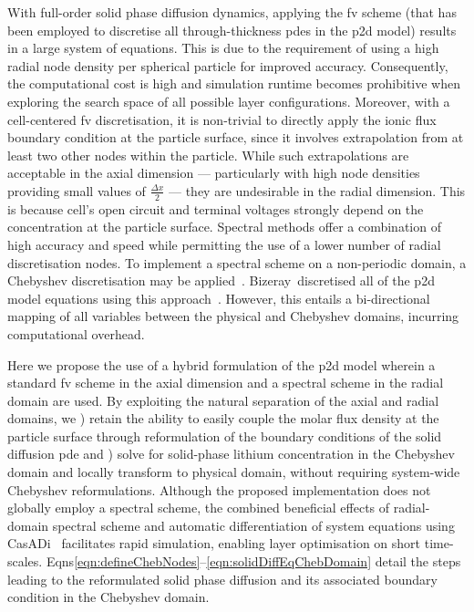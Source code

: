 With full-order solid phase diffusion dynamics, applying the \gls{fv} scheme
(that has been employed to discretise all through-thickness \gls{pde}s in the
\gls{p2d} model) results in a large system of equations. This is due to the
requirement of using a high radial node density per spherical particle
for improved accuracy. Consequently, the computational cost is high and
simulation runtime becomes prohibitive when exploring the search space of
all possible layer configurations. Moreover, with a cell-centered \gls{fv}
discretisation, it is non-trivial to directly apply the ionic flux boundary
condition at the particle surface, since it involves extrapolation from at
least two other nodes within the particle. While such extrapolations are
acceptable in the axial dimension --- particularly with high node densities
providing small values of $\frac{\Delta x}{2}$ --- they are undesirable in
the radial dimension. This is because cell's open circuit and terminal
voltages strongly depend on the concentration at the particle surface. Spectral
methods offer a combination of high accuracy and speed while permitting
the use of a lower number of radial discretisation nodes. To implement a
spectral scheme on a non-periodic domain, a Chebyshev discretisation may be
applied~\cite{Trefethen2000}. Bizeray~\etal discretised all of the \gls{p2d}
model equations using this approach~\cite{Bizeray2015a}. However, this entails a
bi-directional mapping of all variables between the physical and Chebyshev
domains, incurring computational overhead.

Here we propose the use of a hybrid formulation of the \gls{p2d} model wherein a
standard \gls{fv} scheme in the axial dimension and a spectral scheme in the
radial domain are used. By exploiting the natural separation of the axial and
radial domains, we ) retain the ability to easily couple the
molar flux density at the particle surface through reformulation of the
boundary conditions of the solid diffusion pde and ) solve for
solid-phase lithium concentration in the Chebyshev domain and locally transform
to physical domain, without requiring system-wide Chebyshev reformulations.
Although the proposed implementation does not globally employ a spectral
scheme, the combined beneficial effects of radial-domain spectral scheme and
automatic differentiation of system equations using CasADi~\cite{Andersson2013b}
facilitates rapid simulation, enabling layer optimisation on short time-scales.
Eqns\cref{eqn:defineChebNodes}--\cref{eqn:solidDiffEqChebDomain} detail the
steps leading to the reformulated solid phase diffusion and its associated
boundary condition in the Chebyshev domain.

